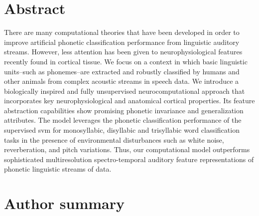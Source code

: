 \documentclass[10pt,letterpaper]{article}
\begin{document}
\section*{Abstract}

There are many computational theories that have been developed in order to improve artificial phonetic classification performance from linguistic auditory streams. However, less attention has been given to neurophysiological features recently found in cortical tissue. We focus on a context in which basic linguistic units--such as phonemes--are extracted and robustly classified by humans and other animals from complex acoustic streams in speech data. We introduce a biologically inspired and fully unsupervised neurocomputational approach that incorporates key neurophysiological and anatomical cortical properties. Its feature abstraction capabilities show promising phonetic invariance and generalization attributes. The model leverages the phonetic classification performance of the supervised \gls{svm} for monosyllabic, disyllabic and trisyllabic word classification tasks in the presence of environmental disturbances such as white noise, reverberation, and pitch variations. Thus, our computational model outperforms sophisticated multiresolution spectro-temporal auditory feature representations of phonetic linguistic streams of data.
%



\section*{Author summary}
\end{document}
